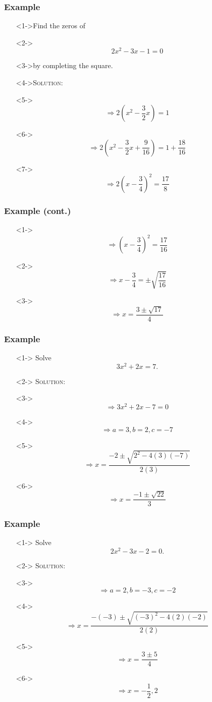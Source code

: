 \documentclass[handout]{beamer}
\begin{document}
\begin{frame}
	\frametitle{Example}
	\begin{enumerate}
		\item[]<1->Find the zeros of
		\item[]<2-> \[ 2x^{2}-3x-1=0 \]
		\item[]<3->by completing the square.
		\item[]<4->\textsc{Solution:}
		\item[]<5->\[ \Rightarrow 2\left( x^{2}-\frac{3}{2}x\right)=1\]
		\item[]<6->\[ \Rightarrow 2\left( x^{2}-\frac{3}{2}x+\frac{9}{16}\right)=1+\frac{18}{16} \]
		\item[]<7-> \[ \Rightarrow 2\left( x-\frac{3}{4} \right)^{2}=\frac{17}{8} \]
	\end{enumerate}
\end{frame}

\begin{frame}
	\frametitle{Example (cont.)}
	\begin{enumerate}
		\item[]<1-> \[ \Rightarrow \left( x-\frac{3}{4} \right)^{2}=\frac{17}{16} \]
		\item[]<2-> \[ \Rightarrow x-\frac{3}{4}=\pm \sqrt{\frac{17}{16}}\]
		\item[]<3-> \[ \Rightarrow x=\frac{3 \pm \sqrt{17}}{4}  \]
	\end{enumerate}
\end{frame}

\begin{frame}
	\frametitle{Example}
	\begin{enumerate}
		\item[]<1-> Solve \[ 3x^{2}+2x=7. \]
		\item[]<2-> \textsc{Solution:}
		\item[]<3-> \[ \Rightarrow 3x^{2}+2x-7=0 \]
		\item[]<4-> \[ \Rightarrow a=3, b=2, c=-7 \]
		\item[]<5-> \[ \Rightarrow x=\frac{-2 \pm \sqrt{2^{2}-4(3)(-7)}}{2(3)}\]
		\item[]<6-> \[ \Rightarrow x=\frac{-1 \pm \sqrt{22}}{3}\]
	\end{enumerate}
\end{frame}

\begin{frame}
	\frametitle{Example}
	\begin{enumerate}
		\item[]<1-> Solve \[ 2x^{2}-3x-2=0. \]
		\item[]<2-> \textsc{Solution:}
		\item[]<3-> \[ \Rightarrow a=2, b=-3, c=-2 \]
		\item[]<4-> \[ \Rightarrow  x=\frac{-(-3)\pm \sqrt{(-3)^{2}-4(2)(-2)}}{2(2)}\]
		\item[]<5-> \[ \Rightarrow x=\frac{3 \pm 5}{4}\]
		\item[]<6-> \[ \Rightarrow x=-\frac{1}{2}, 2\]
	\end{enumerate}
\end{frame}
\end{document}
